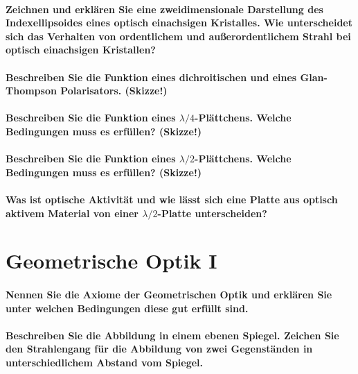 \documentclass[a4paper, 11pt, parskip=half]{scrartcl}
\begin{document}
\paragraph{Zeichnen und erklären Sie eine zweidimensionale Darstellung des Indexellipsoides eines
optisch einachsigen Kristalles. Wie unterscheidet sich das Verhalten von ordentlichem und
außerordentlichem Strahl bei optisch einachsigen Kristallen?}

\paragraph{Beschreiben Sie die Funktion eines dichroitischen und eines Glan-Thompson Polarisators.
(Skizze!)}

\paragraph{Beschreiben Sie die Funktion eines $\lambda/4$-Plättchens. Welche Bedingungen muss es
erfüllen? (Skizze!)}

\paragraph{Beschreiben Sie die Funktion eines $\lambda/2$-Plättchens. Welche Bedingungen muss es
erfüllen? (Skizze!)}

\paragraph{Was ist optische Aktivität und wie lässt sich eine Platte aus optisch aktivem Material
von einer $\lambda/2$-Platte unterscheiden?}

\newpage

\section{Geometrische Optik I}

\paragraph{Nennen Sie die Axiome der Geometrischen Optik und erklären Sie unter welchen Bedingungen
diese gut erfüllt sind.}

\paragraph{Beschreiben Sie die Abbildung in einem ebenen Spiegel. Zeichen Sie den Strahlengang für
die Abbildung von zwei Gegenständen in unterschiedlichem Abstand vom Spiegel.}
\end{document}
